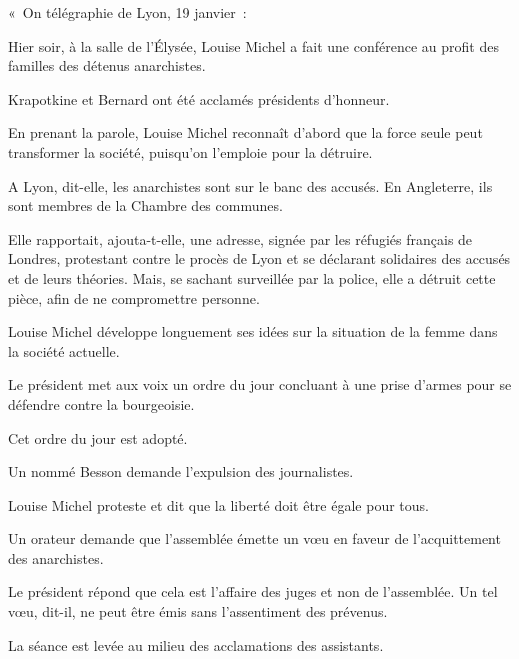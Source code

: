 \documentclass[french,twoside]{book} %
\newenvironment{quoteblock}%
  {\begin{quoting}}
  {\end{quoting}}
\newenvironment{quotebar}{%
    \def\FrameCommand{{\color{rubric!10!}\vrule width 0.5em} \hspace{0.9em}}%
    \def\OuterFrameSep{\itemsep} %
    \MakeFramed {\advance\hsize-\width \FrameRestore}
  }%
  {%
    \endMakeFramed
  }
\renewenvironment{quoteblock}%
  {%
    \savenotes
    \setstretch{0.9}
    \normalfont
    \begin{quotebar}
  }
  {%
    \end{quotebar}
    \spewnotes
  }
\begin{document}
\begin{quoteblock}
 \noindent « On télégraphie de Lyon, 19 janvier :\par
 Hier soir, à la salle de l’Élysée, Louise Michel a fait une conférence au profit des familles des détenus anarchistes.\par
 Krapotkine et Bernard ont été acclamés présidents d’honneur.\par
 En prenant la parole, Louise Michel reconnaît d’abord que la force seule peut transformer la société, puisqu’on l’emploie pour la détruire.\par
 A Lyon, dit-elle, les anarchistes sont sur le banc des accusés. En Angleterre, ils sont membres de la Chambre des communes.\par
 Elle rapportait, ajouta-t-elle, une adresse, signée par les réfugiés français de Londres, protestant contre le procès de Lyon et se déclarant solidaires des accusés et de leurs théories.  Mais, se sachant surveillée par la police, elle a détruit cette pièce, afin de ne compromettre personne.\par
 Louise Michel développe longuement ses idées sur la situation de la femme dans la société actuelle.\par
 Le président met aux voix un ordre du jour concluant à une prise d’armes pour se défendre contre la bourgeoisie.\par
 Cet ordre du jour est adopté.\par
 Un nommé Besson demande l’expulsion des journalistes.\par
 Louise Michel proteste et dit que la liberté doit être égale pour tous.\par
 Un orateur demande que l’assemblée émette un vœu en faveur de l’acquittement des anarchistes.\par
 Le président répond que cela est l’affaire des juges et non de l’assemblée. Un tel vœu, dit-il, ne peut être émis sans l’assentiment des prévenus.\par
 La séance est levée au milieu des acclamations des assistants.
 \end{quoteblock}
\end{document}
